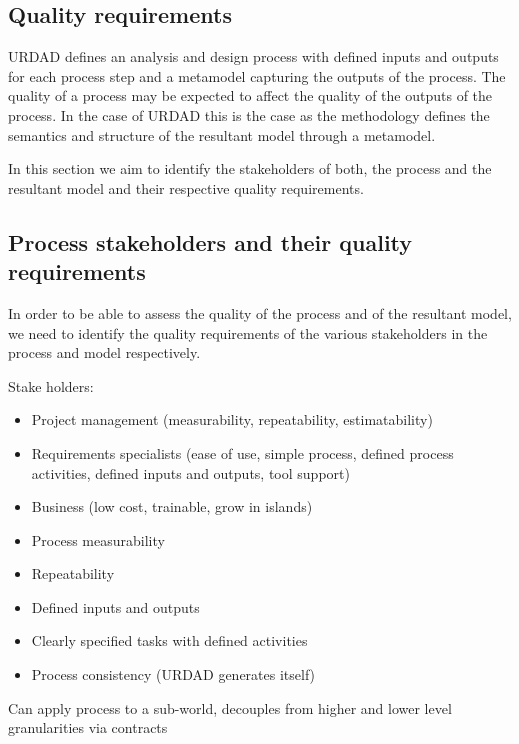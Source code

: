 \subsection{Quality requirements}

URDAD defines an analysis and design process with defined inputs and outputs for each process step and a metamodel capturing the outputs of the process. The quality of a process may be expected to affect the quality of the outputs of the process. In the case of URDAD this is the case as the methodology defines the semantics and structure of the resultant model through a metamodel.

In this section we aim to identify the stakeholders of both, the process and the resultant model and their respective quality requirements.


\subsection{Process stakeholders and their quality requirements}

In order to be able to assess the quality of the process and of the resultant model, we need to identify the quality requirements of the various stakeholders in the process and model respectively.


\cite{berard_what_1995}

Stake holders:
\begin{itemize}
  \item Project management (measurability, repeatability, estimatability)
  \item Requirements specialists (ease of use, simple process, defined process activities, defined inputs and outputs, tool support)
  \item Business (low cost, trainable, grow in islands)
\end{itemize}


\begin{itemize}
  \item Process measurability
  \item Repeatability
  \item Defined inputs and outputs
  \item Clearly specified tasks with defined activities
  \item Process consistency (URDAD generates itself)
\end{itemize}

Can apply process to a sub-world, decouples from higher and lower level granularities via contracts

